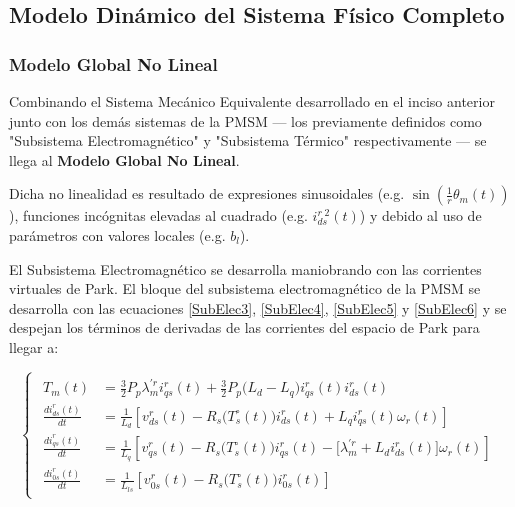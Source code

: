 \documentclass[blue,fullpaper]{ludusofficial}  %
\begin{document}
\subsection{Modelo Dinámico del Sistema Físico Completo}

\subsubsection{Modelo Global No Lineal}
Combinando el Sistema Mecánico Equivalente desarrollado en el inciso anterior junto con los demás sistemas de la PMSM — los previamente definidos como "Subsistema Electromagnético" y "Subsistema Térmico" respectivamente — se llega al \textbf{Modelo Global No Lineal}.

Dicha no linealidad es resultado de expresiones sinusoidales (e.g. $\sin \left( \frac{1}{r} \theta_m(t) \right)$), funciones incógnitas elevadas al cuadrado (e.g. $i_{ds}^{r \; 2}(t)$) y debido al uso de parámetros con valores locales (e.g. $b_l$). 

El Subsistema Electromagnético se desarrolla maniobrando con las corrientes virtuales de Park.  El bloque del subsistema electromagnético de la PMSM se desarrolla con las ecuaciones \eqref{SubElec3}, \eqref{SubElec4}, \eqref{SubElec5} y \eqref{SubElec6} y se despejan los términos de derivadas de las corrientes del espacio de Park para llegar a:

\begin{equation}
\label{eq:modelo-electromagnetico}
\begin{cases} %
\begin{aligned}
        T_{m}(t) &  = \frac{3}{2}P_{p} \lambda_{m}^{'r} i_{qs}^{r}(t) + \frac{3}{2} P_{p} \Big( L_{d} - L_{q} \Big) i_{qs}^{r}(t) i_{ds}^{r}(t)  \\
        \frac{di_{ds}^{r}(t)}{dt} & = \frac{1}{L_{d}} \left[ v_{ds}^{r}(t) - R_{s} \Big( T_{s}^{\circ} (t) \Big) i_{ds}^{r}(t) + L_{q}i_{qs}^{r}(t) \omega_{r}(t)  \right]  \\
        \frac{di_{qs}^{r}(t)}{dt}  & = \frac{1}{L_{q} } \left[ v_{qs}^{r}(t) - R_{s} \Big( T_{s}^{\circ} (t) \Big) i_{qs}^{r}(t) - \big[ \lambda_{m}^{'r} + L_{d} i_{ds}^{r}(t) \big] \omega_{r}(t) \right]  \\
        \frac{di_{0s}^{r}(t)}{dt} & = \frac{1}{ L_{ls} } \left[ v_{0s}^{r}(t) - R_{s} \Big( T_{s}^{\circ} (t) \Big) i_{0s}^{r}(t) \right]
\end{aligned}
\end{cases}
\end{equation}
\end{document}
